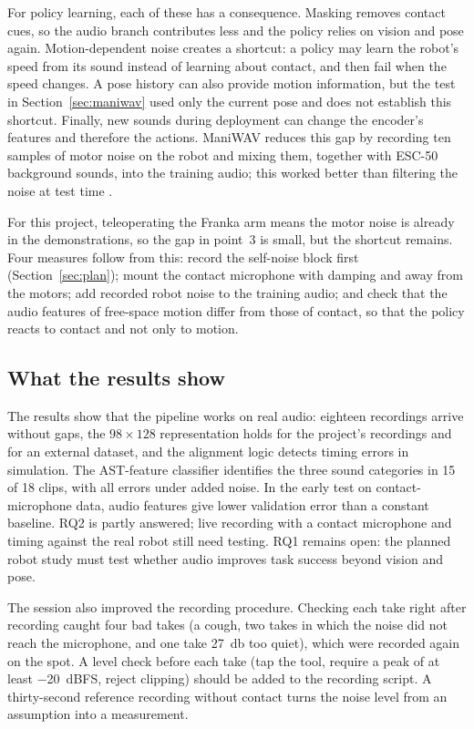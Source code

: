 \documentclass[
  english,
  accentcolor=11b,
  type=intern,
  marginpar=false,
  logofile=figures/PEARLTUDA.png
]{tudapub}
\begin{document}
For policy learning, each of these has a consequence. Masking removes contact cues, so the audio branch contributes less and the policy relies on vision and pose again. Motion-dependent noise creates a shortcut: a policy may learn the robot's speed from its sound instead of learning about contact, and then fail when the speed changes. A pose history can also provide motion information, but the test in Section~\ref{sec:maniwav} used only the current pose and does not establish this shortcut. Finally, new sounds during deployment can change the encoder's features and therefore the actions. ManiWAV reduces this gap by recording ten samples of motor noise on the robot and mixing them, together with ESC-50 background sounds, into the training audio; this worked better than filtering the noise at test time \citep{liu2024maniwav}.

For this project, teleoperating the Franka arm means the motor noise is already in the demonstrations, so the gap in point~3 is small, but the shortcut remains. Four measures follow from this: record the self-noise block first (Section~\ref{sec:plan}); mount the contact microphone with damping and away from the motors; add recorded robot noise to the training audio; and check that the audio features of free-space motion differ from those of contact, so that the policy reacts to contact and not only to motion.

\subsection{What the results show}

The results show that the pipeline works on real audio: eighteen recordings arrive without gaps, the \(98\times128\) representation holds for the project's recordings and for an external dataset, and the alignment logic detects timing errors in simulation. The AST-feature classifier identifies the three sound categories in 15 of 18 clips, with all errors under added noise. In the early test on contact-microphone data, audio features give lower validation error than a constant baseline. RQ2 is partly answered; live recording with a contact microphone and timing against the real robot still need testing. RQ1 remains open: the planned robot study must test whether audio improves task success beyond vision and pose.

The session also improved the recording procedure. Checking each take right after recording caught four bad takes (a cough, two takes in which the noise did not reach the microphone, and one take \SI{27}{\decibel} too quiet), which were recorded again on the spot. A level check before each take (tap the tool, require a peak of at least \SI{-20}{dBFS}, reject clipping) should be added to the recording script. A thirty-second reference recording without contact turns the noise level from an assumption into a measurement.
\end{document}
